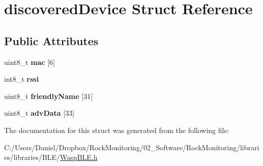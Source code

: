 \hypertarget{structdiscovered_device}{}\section{discovered\+Device Struct Reference}
\label{structdiscovered_device}
\subsection*{Public Attributes}
\begin{DoxyCompactItemize}
\item 
uint8\+\_\+t {\bfseries mac} \mbox{[}6\mbox{]}\hypertarget{structdiscovered_device_a32a57656c24d96c94ad5eff2bd16efcc}{}\label{structdiscovered_device_a32a57656c24d96c94ad5eff2bd16efcc}

\item 
int8\+\_\+t {\bfseries rssi}\hypertarget{structdiscovered_device_a67a79e747905274ed1f91cdac3e51310}{}\label{structdiscovered_device_a67a79e747905274ed1f91cdac3e51310}

\item 
uint8\+\_\+t {\bfseries friendly\+Name} \mbox{[}31\mbox{]}\hypertarget{structdiscovered_device_a2482c60ae4e1a6f273514ba2ac7c8845}{}\label{structdiscovered_device_a2482c60ae4e1a6f273514ba2ac7c8845}

\item 
uint8\+\_\+t {\bfseries adv\+Data} \mbox{[}33\mbox{]}\hypertarget{structdiscovered_device_a9f32b12b049f594529dd1ae0d5aca157}{}\label{structdiscovered_device_a9f32b12b049f594529dd1ae0d5aca157}

\end{DoxyCompactItemize}


The documentation for this struct was generated from the following file\+:\begin{DoxyCompactItemize}
\item 
C\+:/\+Users/\+Daniel/\+Dropbox/\+Rock\+Monitoring/02\+\_\+\+Software/\+Rock\+Monitoring/libraries/libraries/\+B\+L\+E/\hyperlink{_wasp_b_l_e_8h}{Wasp\+B\+L\+E.\+h}\end{DoxyCompactItemize}
